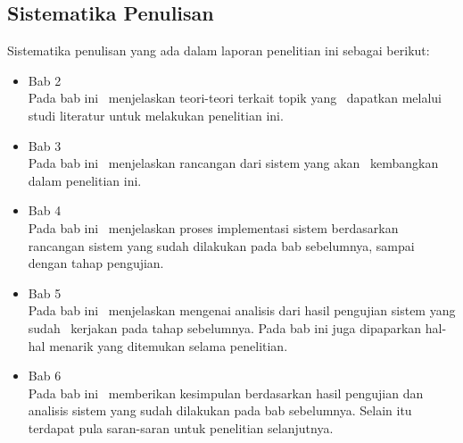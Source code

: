 
\section{Sistematika Penulisan}
Sistematika penulisan yang ada dalam laporan penelitian ini sebagai berikut:
\begin{itemize}

	\item Bab 2 \babDua \\
	Pada bab ini \saya~menjelaskan teori-teori terkait topik yang \saya~dapatkan melalui studi literatur untuk melakukan penelitian ini.
		
	\item Bab 3 \babTiga \\
	Pada bab ini \saya~menjelaskan rancangan dari sistem yang akan \saya~kembangkan dalam penelitian ini.
		
	\item Bab 4 \babEmpat \\
	Pada bab ini \saya~menjelaskan proses implementasi sistem berdasarkan rancangan sistem yang sudah dilakukan pada bab sebelumnya, sampai dengan tahap pengujian.
		
	\item Bab 5 \babLima \\
	Pada bab ini \saya~menjelaskan mengenai analisis dari hasil pengujian sistem yang sudah \saya~kerjakan pada tahap sebelumnya. Pada bab ini juga dipaparkan hal-hal menarik yang ditemukan selama penelitian.
	
	\item Bab 6 \babEnam \\
	Pada bab ini \saya~memberikan kesimpulan berdasarkan hasil pengujian dan analisis sistem yang sudah dilakukan pada bab sebelumnya. Selain itu terdapat pula saran-saran untuk penelitian selanjutnya.
	
\end{itemize}%
\chapter{\babDua}

